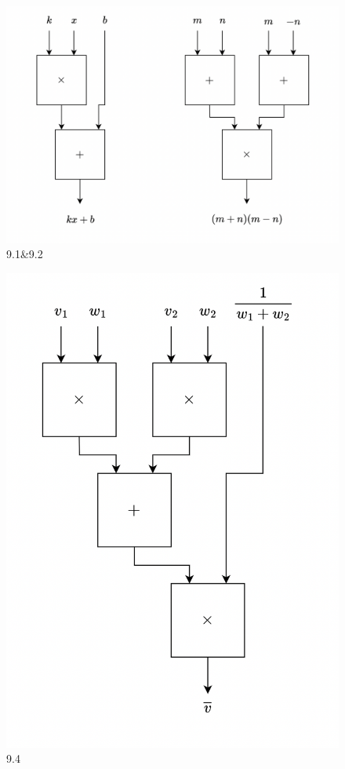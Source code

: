 \documentclass[UTF8]{ctexart}
\begin{document}
\section{}
\begin{figure}[h]
  \centering
  \includegraphics[scale=0.3]{hw_1.png}
  \caption{9.1\&9.2}
\end{figure}
\begin{figure}[h]
  \centering
  \includegraphics[scale=0.3]{hw_1_2.png}
  \caption{9.4}
\end{figure}
\end{document}

